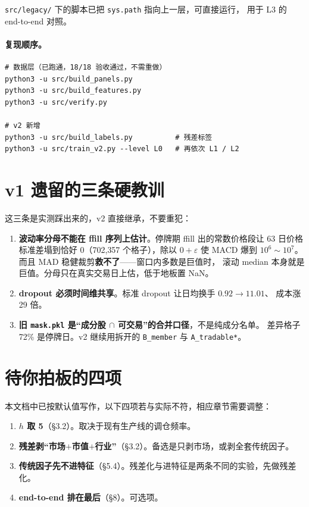 \documentclass[11pt, a4paper]{ctexart}
\newcommand{\file}[1]{\texttt{\small #1}}
\begin{document}
\noindent
\file{src/legacy/} 下的脚本已把 \file{sys.path} 指向上一层，可直接运行，
用于 L3 的 end-to-end 对照。

\paragraph{复现顺序。}
\begin{lstlisting}
# 数据层（已跑通，18/18 验收通过，不需重做）
python3 -u src/build_panels.py
python3 -u src/build_features.py
python3 -u src/verify.py

# v2 新增
python3 -u src/build_labels.py          # 残差标签
python3 -u src/train_v2.py --level L0   # 再依次 L1 / L2
\end{lstlisting}

\section{v1 遗留的三条硬教训}
这三条是实测踩出来的，v2 直接继承，不要重犯：

\begin{enumerate}
  \item \textbf{波动率分母不能在 ffill 序列上估计}。停牌期 ffill 出的常数价格段让
        63 日价格标准差塌到恰好 0（702{,}357 个格子），除以 $0+\varepsilon$ 使 MACD
        爆到 $10^6\sim10^7$。而且 MAD 稳健裁剪\textbf{救不了}——窗口内多数是巨值时，
        滚动 median 本身就是巨值。分母只在真实交易日上估，低于地板置 NaN。
  \item \textbf{dropout 必须时间维共享}。标准 dropout 让日均换手 $0.92\to11.01$、
        成本涨 29 倍。
  \item \textbf{旧 \file{mask.pkl} 是“成分股 $\cap$ 可交易”的合并口径}，不是纯成分名单。
        差异格子 72\% 是停牌日。v2 继续用拆开的 \file{B\_member} 与 \file{A\_tradable*}。
\end{enumerate}

\section{待你拍板的四项}
本文档中已按默认值写作，以下四项若与实际不符，相应章节需要调整：

\begin{enumerate}
  \item \textbf{$h$ 取 5}（\S3.2）。取决于现有生产线的调仓频率。
  \item \textbf{残差剥“市场$+$市值$+$行业”}（\S3.2）。备选是只剥市场，或剥全套传统因子。
  \item \textbf{传统因子先不进特征}（\S5.4）。残差化与进特征是两条不同的实验，先做残差化。
  \item \textbf{end-to-end 排在最后}（\S8）。可选项。
\end{enumerate}
\end{document}
